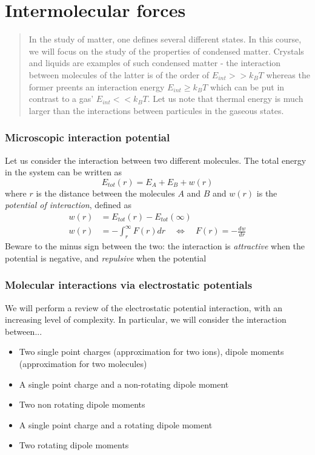 \documentclass[../phys-f308.tex]{subfiles}
\begin{document}
    \part{Intermolecular forces}
    \begin{abstract}
        In the study of matter, one defines several different states. In this course, we will focus on the study of the properties of condensed matter. Crystals and liquids are examples of such condensed matter - the interaction between molecules of the latter is of the order of $E_{int}>> k_BT$ whereas the former preents an interaction energy $E_{int}\geq k_BT$ which can be put in contrast to a gas' $E_{int}<< k_BT$. Let us note that thermal energy is much larger than the interactions between particules in the gaseous states. 
    \end{abstract}

    \section{Microscopic interaction potential}

    Let us consider the interaction between two different molecules. The total energy in the system can be written as
    \begin{equation}
        E_{tot}(r) = E_A+E_B+w(r)
    \end{equation}
    where $r$ is the distance between the molecules $A$ and $B$ and $w(r)$ is the \emph{potential of interaction}, defined as
    \begin{align}
        w(r) &= E_{tot}(r) - E_{tot}(\infty)\\
        w(r) &= -\int_r^{\infty}F(r)dr \quad \Leftrightarrow \quad F(r) = -\frac{dw}{dr}\label{eq: F dw/dr}
    \end{align}
    Beware to the minus sign between the two: the interaction is \emph{attractive} when the potential is negative, and \emph{repulsive} when the potential   

    \section{Molecular interactions via electrostatic potentials}

    We will perform a review of the electrostatic potential interaction, with an increasing level of complexity. In particular, we will consider the interaction between...
    \begin{itemize}
        \item Two single point charges (approximation for two ions), dipole moments (approximation for two molecules)
        \item A single point charge and a non-rotating dipole moment
        \item Two non rotating dipole moments
        \item A single point charge and a rotating dipole moment
        \item Two rotating dipole moments
    \end{itemize}
\end{document}
